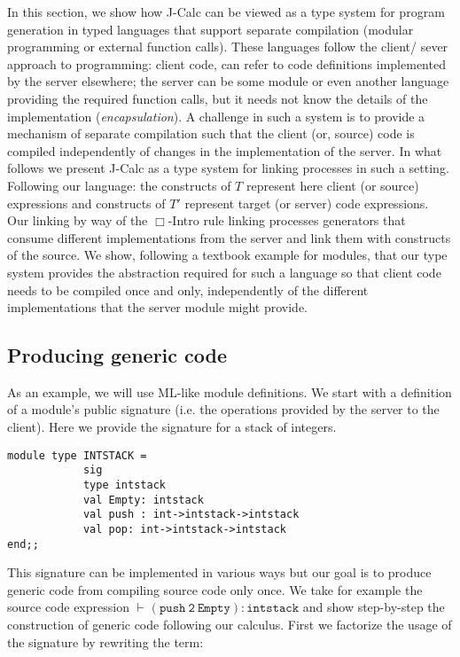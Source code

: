 \documentclass[11pt]{entcs}
\begin{document}
In this section, we show how J-Calc can be viewed as a type system for program generation in typed languages that support separate compilation (modular programming or external function calls). These languages follow the client/ sever approach to programming: client code, can refer to code definitions implemented by the server elsewhere; the server can be some module or even another language providing the required function calls, but it needs not know the details of the implementation (\textit{encapsulation}).  A challenge in such a system is to provide a mechanism of separate compilation such that the client (or, source) code is compiled independently of changes in the implementation of the server. In what follows we present J-Calc as a type system for linking processes in such a setting. Following our language: the constructs of $T$ represent here client (or source) expressions and constructs of $T'$ represent target (or server) code expressions. Our linking by way of the $\Box$-Intro rule linking processes generators that consume different implementations from the server and link them with constructs of the source. 
We show, following a textbook example for modules, that our type system provides the abstraction required for such a language so that client code needs to be compiled once and only, independently of the different implementations that the server module might provide.

\subsection{Producing generic code}
As an example, we will use  ML-like module  definitions.  We start with a definition of a module's public signature (i.e. the operations provided by the server to the client). Here  we provide the signature for a stack of integers.
\bigskip

\begin{verbatim}
module type INTSTACK =
            sig
            type intstack
            val Empty: intstack
            val push : int->intstack->intstack
            val pop: int->intstack->intstack
end;;
\end{verbatim}
\bigskip

This signature can be implemented in various ways but our goal is to produce generic code from compiling source code only once. We take for example the source code expression  $\mathtt{\vdash_{}(push \ 2 \ Empty):intstack}$ and show  step-by-step the construction of generic code following our calculus. First we factorize the usage of the signature by rewriting the term:
\end{document}
